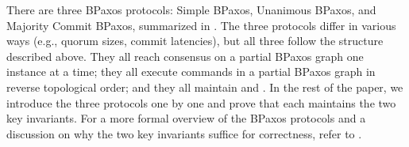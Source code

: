 There are three BPaxos protocols: Simple BPaxos, Unanimous BPaxos, and Majority
Commit BPaxos, summarized in . The three protocols differ
in various ways (e.g., quorum sizes, commit latencies), but all
three follow the structure described above. They all reach consensus on a
partial BPaxos graph one instance at a time; they all execute commands in a
partial BPaxos graph in reverse topological order; and they all maintain  and
. In the rest of the paper, we introduce the
three protocols one by one and prove that each maintains the two key
invariants. For a more formal overview of the BPaxos protocols and a discussion
on why the two key invariants suffice for correctness, refer to
.



